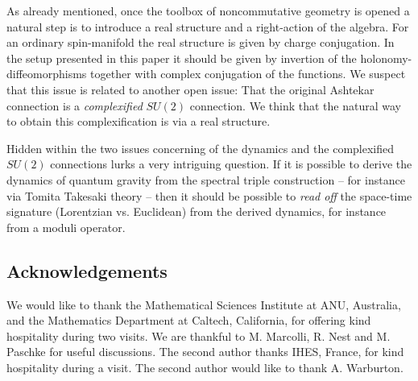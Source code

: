 \documentclass[12pt]{article}
\begin{document}
As already mentioned, once the toolbox of noncommutative geometry is opened a natural step is to introduce a real structure and a right-action of the algebra. For an ordinary spin-manifold the real structure is given by charge conjugation. In the setup presented in this paper it should be given by invertion of the holonomy-diffeomorphisms together with complex conjugation of the functions. We suspect that this issue is related to  another open issue: That the original Ashtekar connection is a {\it complexified} $SU(2)$ connection. We think that the natural way to obtain this complexification is via a real structure. 



Hidden within the two issues concerning of the dynamics and the complexified $SU(2)$ connections lurks a very intriguing question. If it is possible to derive the dynamics of quantum gravity from the spectral triple construction -- for instance via Tomita Takesaki theory --  then it should be possible to {\it read off} the space-time signature (Lorentzian vs. Euclidean) from the derived dynamics, for instance from a moduli operator. 































\subsection*{Acknowledgements}

We would like to thank the Mathematical Sciences Institute at ANU, Australia, and the Mathematics Department at Caltech, California, for offering kind hospitality during two visits. We are thankful to M. Marcolli, R. Nest and M. Paschke for useful discussions. The second author thanks IHES, France, for kind hospitality during a visit. The second author would like to thank A. Warburton. 
\end{document}
